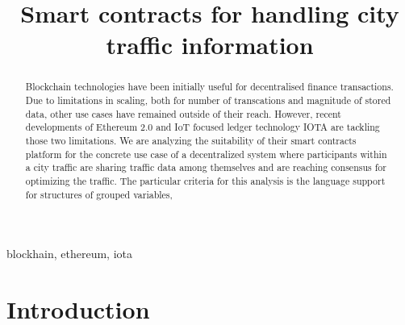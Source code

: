 \documentclass[conference]{IEEEtran}
\begin{document}
\title{Smart contracts for handling city traffic information}

\author{
    \and
}

\maketitle

\begin{abstract}

    Blockchain technologies have been initially useful for decentralised finance transactions. Due to limitations in scaling, both for number of transcations and magnitude of stored data, other use cases have remained outside of their reach. However, recent developments of Ethereum 2.0 and IoT focused ledger technology IOTA are tackling those two limitations. We are analyzing the suitability of their smart contracts platform for the concrete use case of a decentralized system where participants within a city traffic are sharing traffic data among themselves and are reaching consensus for optimizing the traffic. The particular criteria for this analysis is the language support for structures of grouped variables, 

\end{abstract}

\begin{IEEEkeywords}

    blockhain, ethereum, iota
    
\end{IEEEkeywords}

\section{Introduction}
\end{document}
